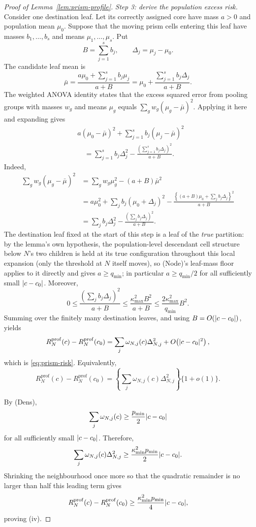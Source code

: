 \documentclass[11pt]{article}
\theoremstyle{plain}
\theoremstyle{definition}
\theoremstyle{remark}
\DeclarePairedDelimiter{\abs}{\lvert}{\rvert}
\begin{document}
\begin{proof}[Proof of Lemma~\ref{lem:prism-profile}]
\emph{Step 3: derive the population excess risk.}
Consider one destination leaf.  Let its correctly assigned core have mass
\(a>0\) and population mean \(\mu_0\).  Suppose that the moving prism cells
entering this leaf have masses \(b_1,\ldots,b_s\) and means
\(\mu_1,\ldots,\mu_s\).  Put
\[
  B=\sum_{j=1}^s b_j,
  \qquad
  \Delta_j=\mu_j-\mu_0.
\]
The candidate leaf mean is
\[
  \bar\mu
  =
  \frac{a\mu_0+\sum_{j=1}^s b_j\mu_j}{a+B}
  =
  \mu_0+\frac{\sum_{j=1}^s b_j\Delta_j}{a+B}.
\]
The weighted ANOVA identity states that the excess squared error from pooling
groups with masses \(w_g\) and means \(\mu_g\) equals
\(\sum_g w_g(\mu_g-\bar\mu)^2\).  Applying it here and expanding gives
\begin{align*}
  &a(\mu_0-\bar\mu)^2
    +\sum_{j=1}^s b_j(\mu_j-\bar\mu)^2
  \\
  &\quad=
    \sum_{j=1}^s b_j\Delta_j^2
    -
    \frac{\left(\sum_{j=1}^s b_j\Delta_j\right)^2}{a+B}.
\end{align*}
Indeed,
\begin{align*}
  \sum_{g}w_g(\mu_g-\bar\mu)^2
  &=
  \sum_g w_g\mu_g^2-(a+B)\bar\mu^2
  \\
  &=
  a\mu_0^2+\sum_j b_j(\mu_0+\Delta_j)^2
  -
  \frac{\left\{(a+B)\mu_0+\sum_j b_j\Delta_j\right\}^2}{a+B}
  \\
  &=
  \sum_j b_j\Delta_j^2
  -
  \frac{\left(\sum_j b_j\Delta_j\right)^2}{a+B}.
\end{align*}
The destination leaf fixed at the start of this step is a leaf of the
\emph{true} partition: by the lemma's own hypothesis, the population-level
descendant cell structure below \(N\)'s two children is held at its true
configuration throughout this local expansion (only the threshold at \(N\)
itself moves), so (Node)'s leaf-mass floor applies to it directly and gives
\(a\ge q_{\min}\); in particular \(a\ge q_{\min}/2\) for all sufficiently
small \(\abs{c-c_0}\).  Moreover,
\[
  0
  \le
  \frac{\left(\sum_j b_j\Delta_j\right)^2}{a+B}
  \le
  \frac{\kappa_{\max}^2 B^2}{a+B}
  \le
  \frac{2\kappa_{\max}^2}{q_{\min}}B^2.
\]
Summing over the finitely many destination leaves, and using
\(B=O(\abs{c-c_0})\), yields
\[
  R_N^{\mathrm{prof}}(c)-R_N^{\mathrm{prof}}(c_0)
  =
  \sum_j\omega_{N,j}(c)\Delta_{N,j}^2
  +O\!\left(\abs{c-c_0}^2\right),
\]
which is \eqref{eq:prism-risk}.  Equivalently,
\[
  R_N^{\mathrm{prof}}(c)-R_N^{\mathrm{prof}}(c_0)
  =
  \left\{\sum_j\omega_{N,j}(c)\Delta_{N,j}^2\right\}
  \{1+o(1)\}.
\]

By (Dens),
\[
  \sum_j\omega_{N,j}(c)
  \ge \frac{p_{\min}}{2}\abs{c-c_0}
\]
for all sufficiently small \(\abs{c-c_0}\).  Therefore,
\[
  \sum_j\omega_{N,j}(c)\Delta_{N,j}^2
  \ge
  \frac{\kappa_{\min}^2p_{\min}}{2}\abs{c-c_0}.
\]
Shrinking the neighbourhood once more so that the quadratic remainder is no
larger than half this leading term gives
\[
  R_N^{\mathrm{prof}}(c)-R_N^{\mathrm{prof}}(c_0)
  \ge
  \frac{\kappa_{\min}^2p_{\min}}{4}\abs{c-c_0},
\]
proving (iv).


\end{proof}
\end{document}

